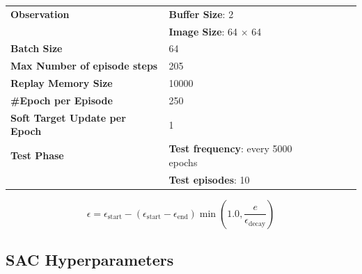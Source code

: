 \begin{table}[!h]
{\begin{tabular}{@{}lllll@{}}
			\textbf{Observation}                  & \textbf{Buffer Size}: 2                                           \\
			                                      & \textbf{Image Size}: 64 $\times$ 64                               \\\midrule
			\textbf{Batch Size}                   & 64                                                                \\\midrule
			\textbf{Max Number of episode steps}  & 205                                                               \\\midrule
			\textbf{Replay Memory Size}           & 10000                                                             \\\midrule

			\textbf{\#Epoch per Episode}          & 250                                                               \\\midrule
			\textbf{Soft Target Update per Epoch} & 1                                                                 \\\midrule
			\textbf{Test Phase}                   & \textbf{Test frequency}: every 5000 epochs                        \\
			                                      & \textbf{Test episodes}: 10                                        \\
			\bottomrule
		\end{tabular}}
\end{table}

\begin{equation}
	\label{eq:epsilon_decay}
	\epsilon = \epsilon_{\text{start}} - (\epsilon_{\text{start}} -\epsilon_{\text{end}})\min(1.0, \frac{e}{\epsilon_{\text{decay}}})
\end{equation}

\FloatBarrier

\subsection{SAC Hyperparameters}

